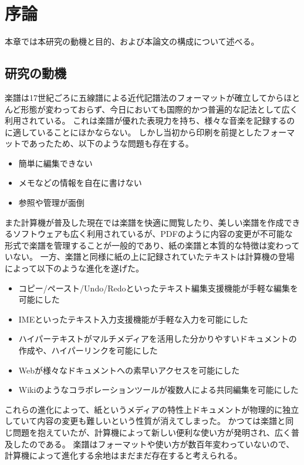 \chapter{序論}
\label{chap:introduction}

本章では本研究の動機と目的、および本論文の構成について述べる。

\newpage

\section{研究の動機}

楽譜は17世紀ごろに五線譜による近代記譜法のフォーマットが確立してからほとんど形態が変わっておらず、今日においても国際的かつ普遍的な記法として広く利用されている。
これは楽譜が優れた表現力を持ち、様々な音楽を記録するのに適していることにほかならない。
しかし当初から印刷を前提としたフォーマットであったため、以下のような問題も存在する。

\begin{itemize}
    \item 簡単に編集できない
    \item メモなどの情報を自在に書けない
    \item 参照や管理が面倒
\end{itemize}

また計算機が普及した現在では楽譜を快適に閲覧したり、美しい楽譜を作成できるソフトウェアも広く利用されているが、PDFのように内容の変更が不可能な形式で楽譜を管理することが一般的であり、紙の楽譜と本質的な特徴は変わっていない。
一方、楽譜と同様に紙の上に記録されていたテキストは計算機の登場によって以下のような進化を遂げた。

\begin{itemize}
    \item コピー/ペースト/Undo/Redoといったテキスト編集支援機能が手軽な編集を可能にした
    \item IMEといったテキスト入力支援機能が手軽な入力を可能にした
    \item ハイパーテキストがマルチメディアを活用した分かりやすいドキュメントの作成や、ハイパーリンクを可能にした
    \item Webが様々なドキュメントへの素早いアクセスを可能にした
    \item Wikiのようなコラボレーションツールが複数人による共同編集を可能にした
\end{itemize}

これらの進化によって、紙というメディアの特性上ドキュメントが物理的に独立していて内容の変更も難しいという性質が消えてしまった。
かつては楽譜と同じ問題を抱えていたが、計算機によって新しい便利な使い方が発明され、広く普及したのである。
楽譜はフォーマットや使い方が数百年変わっていないので、計算機によって進化する余地はまだまだ存在すると考えられる。

